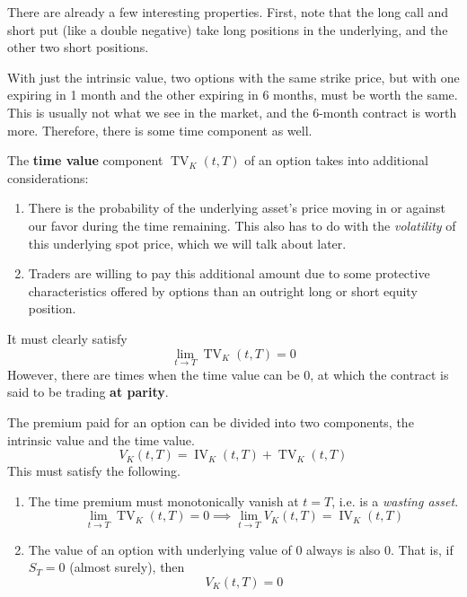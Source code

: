 \documentclass{article}
\DeclareMathOperator{\IV}{IV}
\DeclareMathOperator{\TV}{TV}
\begin{document}
\begin{example}
      There are already a few interesting properties. First, note that the long call and short put (like a double negative) take long positions in the underlying, and the other two short positions. 
    \end{example}

    With just the intrinsic value, two options with the same strike price, but with one expiring in 1 month and the other expiring in 6 months, must be worth the same. This is usually not what we see in the market, and the 6-month contract is worth more. Therefore, there is some time component as well. 

    \begin{definition}
      The \textbf{time value} component $\TV_K (t, T)$ of an option takes into additional considerations: 
      \begin{enumerate}
        \item There is the probability of the underlying asset's price moving in or against our favor during the time remaining. This also has to do with the \textit{volatility} of this underlying spot price, which we will talk about later. 

        \item Traders are willing to pay this additional amount due to some protective characteristics offered by options than an outright long or short equity position. 
      \end{enumerate}
      It must clearly satisfy  
      \begin{equation}
        \lim_{t \rightarrow T} \TV_K (t, T) = 0
      \end{equation}
      However, there are times when the time value can be $0$, at which the contract is said to be trading \textbf{at parity}. 
    \end{definition}

    \begin{theorem}
      The premium paid for an option can be divided into two components, the intrinsic value and the time value. 
      \begin{equation}
        V_K(t, T) = \IV_{K} (t, T) + \TV_K (t, T)
      \end{equation}
      This must satisfy the following. 
      \begin{enumerate}
        \item The time premium must monotonically vanish at $t = T$, i.e. is a \textit{wasting asset}. 
          \begin{equation}
            \lim_{t \rightarrow T} \TV_K (t, T) = 0 \implies \lim_{t \rightarrow T} V_K (t, T) = \IV_K (t, T) 
          \end{equation}
        \item The value of an option with underlying value of $0$ always is also $0$. That is, if $S_T = 0$ (almost surely), then 
          \begin{equation}
            V_K (t, T)  = 0
          \end{equation}
      \end{enumerate}
    \end{theorem}
\end{document}
